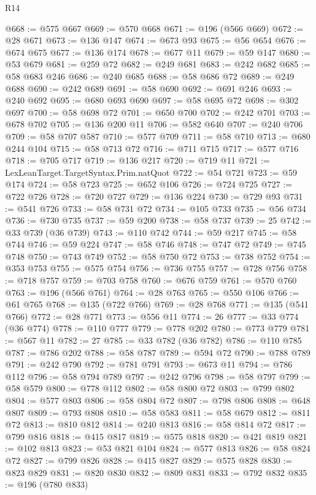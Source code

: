 \begin{lexlean}{R14}
\begin{coremodule}
@668 := @575 @667
@669 := @570 @668
@671 := @196 (@566 @669)
@672 := @28 @671
@673 := @136 @147
@674 := @673 @93
@675 := @56 @654
@676 := @674 @675
@677 := @136 @174
@678 := @677 @11
@679 := @59 @147
@680 := @53 @679
@681 := @259 @72
@682 := @249 @681
@683 := @242 @682
@685 := @58 @683 @246
@686 := @240 @685
@688 := @58 @686 @72
@689 := @249 @688
@690 := @242 @689
@691 := @58 @690
@692 := @691 @246
@693 := @240 @692
@695 := @680 @693 @690
@697 := @58 @695 @72
@698 := @302 @697
@700 := @58 @698 @72
@701 := @650 @700
@702 := @242 @701
@703 := @678 @702
@705 := @136 @200 @11
@706 := @582 @640
@707 := @240 @706
@709 := @58 @707 @587
@710 := @577 @709
@711 := @58 @710
@713 := @680 @244 @104
@715 := @58 @713 @72
@716 := @711 @715
@717 := @577 @716
@718 := @705 @717
@719 := @136 @217
@720 := @719 @11
@721 := LexLeanTarget.TargetSyntax.Prim.natQuot
@722 := @54 @721
@723 := @59 @174
@724 := @58 @723
@725 := @652 @106
@726 := @724 @725
@727 := @722 @726
@728 := @720 @727
@729 := @136 @224
@730 := @729 @93
@731 := @541 @726
@733 := @58 @731 @72
@734 := @105 @733
@735 := @56 @734
@736 := @730 @735
@737 := @59 @200
@738 := @58 @737
@739 := 25
@742 := @33 @739 (@36 @739)
@743 := @110 @742
@744 := @59 @217
@745 := @58 @744
@746 := @59 @224
@747 := @58 @746
@748 := @747 @72
@749 := @745 @748
@750 := @743 @749
@752 := @58 @750 @72
@753 := @738 @752
@754 := @353 @753
@755 := @575 @754
@756 := @736 @755
@757 := @728 @756
@758 := @718 @757
@759 := @703 @758
@760 := @676 @759
@761 := @570 @760
@763 := @196 (@566 @761)
@764 := @28 @763
@765 := @550 @106
@766 := @61 @765
@768 := @135 (@722 @766)
@769 := @28 @768
@771 := @135 (@541 @766)
@772 := @28 @771
@773 := @556 @11
@774 := 26
@777 := @33 @774 (@36 @774)
@778 := @110 @777
@779 := @778 @202
@780 := @773 @779
@781 := @567 @11
@782 := 27
@785 := @33 @782 (@36 @782)
@786 := @110 @785
@787 := @786 @202
@788 := @58 @787
@789 := @594 @72
@790 := @788 @789
@791 := @242 @790
@792 := @781 @791
@793 := @673 @11
@794 := @786 @112
@796 := @58 @794 @789
@797 := @242 @796
@798 := @58 @797
@799 := @58 @579
@800 := @778 @112
@802 := @58 @800 @72
@803 := @799 @802
@804 := @577 @803
@806 := @58 @804 @72
@807 := @798 @806
@808 := @648 @807
@809 := @793 @808
@810 := @58 @583
@811 := @58 @679
@812 := @811 @72
@813 := @810 @812
@814 := @240 @813
@816 := @58 @814 @72
@817 := @799 @816
@818 := @415 @817
@819 := @575 @818
@820 := @421 @819
@821 := @102 @813
@823 := @53 @821 @104
@824 := @577 @813
@826 := @58 @824 @72
@827 := @799 @826
@828 := @415 @827
@829 := @575 @828
@830 := @823 @829
@831 := @820 @830
@832 := @809 @831
@833 := @792 @832
@835 := @196 (@780 @833)

\end{coremodule}
\end{lexlean}
